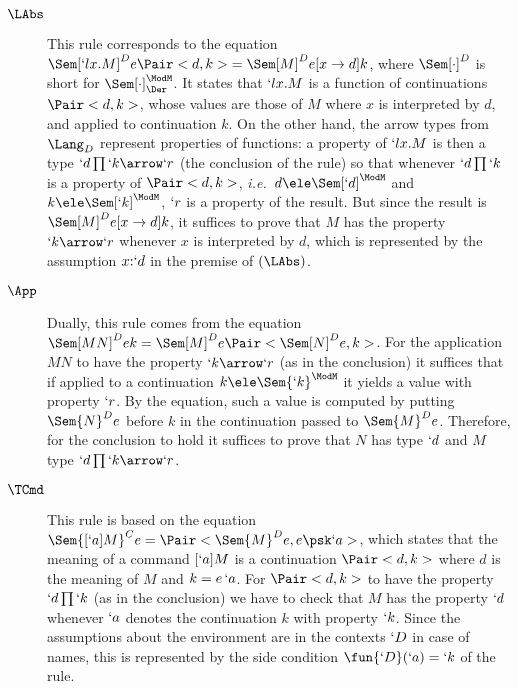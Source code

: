 \documentclass{CSML}
\def\ie{\emph{i.e.}}
\begin{document}
 \begin{description}

 \item [$\LAbs$] 
This rule corresponds to the equation $\Sem[`lx.M]^D{ e }{ \Pair<d,k> } = \Sem[M]^D{ e[x \to d] }{ k }$, where $\Sem[\cdot]^D$ is short for $\Sem[\cdot]_\Der^{\ModM}$. 
It states that $`lx.M$ is a function of continuations $\Pair<d,k>$, whose values are those of $M$ where $x$ is interpreted by $d$, and applied to continuation $k$. 
On the other hand, the arrow types from $\Lang_D$ represent properties of functions:
a property of $`lx.M$ is then a type $`d\prod `k\arrow `r$ (the conclusion of the rule) so that whenever $`d\prod `k$ is a property of $\Pair<d,k>$, \ie~$d \ele \Sem[`d]^{\ModM}$ and $k \ele \Sem[`k]^{\ModM}$, $`r$ is a property of the result. 
But since the result is $\Sem[M]^D{ e[x \to d] }{ k }$, it suffices to prove that $M$ has the property $`k\arrow `r$ whenever $x$ is interpreted by $d$, which is represented by the assumption $x{:}`d$ in the premise of $(\LAbs)$.

 \item [$\App$] 
Dually, this rule comes from the equation $\Sem[MN]^D{ e }{ k } = \Sem[M]^D{ e }{ \Pair<\Sem[N]^D{ e } , k > }$. 
For the application $MN$ to have the property $`k\arrow `r$ (as in the conclusion)
it suffices that if applied to a continuation $k \ele \Sem{ `k }^{\ModM}$ it yields a value with property $`r$. By the equation, such a value is
computed by putting $\Sem{ N }^D{ e }$ before $k$ in the continuation passed to $\Sem{ M }^D{ e }$. 
Therefore, for the conclusion to hold it suffices to prove that $N$ has type $`d$ and $M$ type $`d\prod `k\arrow `r$. %

 \item [$\TCmd$] 
This rule is based on the equation $\Sem{ [`a]M}^C{ e } = \Pair<\Sem{ M }^D { e } , e\psk `a >$, which states that the meaning of a command $[`a]M$ is a continuation $\Pair<d,k>$ where $d$ is the meaning of $M$ and $k = e \, `a $. 
For $\Pair<d,k>$ to have the property $`d\prod `k$ (as in the conclusion) we have to check that $M$ has the property $`d$ whenever $`a$ denotes the continuation $k$ with property $`k$. 
Since the assumptions about the environment are in the contexts $`D $ in case of names, this is represented by the side condition $\fun{`D }(`a)=`k$ of the rule.



\end{description}
\end{document}
